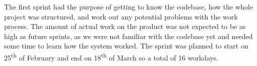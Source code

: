 The first sprint had the purpose of getting to know the codebase, how the whole project was structured, and work out any potential problems with the work process. 
The amount of actual work on the product was not expected to be as high as future sprints, as we were not familiar with the codebase yet and needed some time to learn how the system worked. 
The sprint was planned to start on 25\textsuperscript{th} of February and end on 18\textsuperscript{th} of March so a total of 16 workdays.

